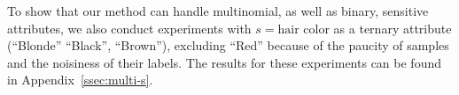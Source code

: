 To show that our method can handle multinomial, as well as binary, sensitive attributes, we also conduct experiments with $s=\textrm{hair color}$ as a ternary attribute (``Blonde'' ``Black'', ``Brown''), excluding ``Red'' because of the paucity of samples and the noisiness of their labels. The results for these experiments can be found in Appendix~\ref{ssec:multi-s}.

